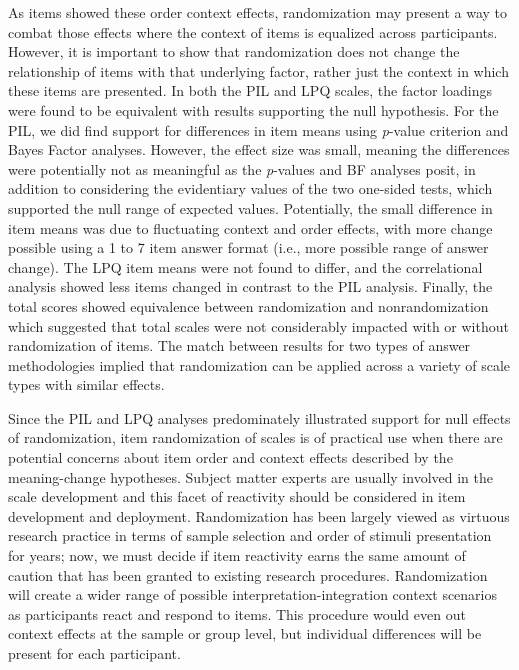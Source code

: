 \documentclass[english,man]{apa6}
\theoremstyle{definition}
\theoremstyle{definition}
\theoremstyle{definition}
\theoremstyle{remark}
\begin{document}
As items showed these order context effects, randomization may present a
way to combat those effects where the context of items is equalized
across participants. However, it is important to show that randomization
does not change the relationship of items with that underlying factor,
rather just the context in which these items are presented. In both the
PIL and LPQ scales, the factor loadings were found to be equivalent with
results supporting the null hypothesis. For the PIL, we did find support
for differences in item means using \emph{p}-value criterion and Bayes
Factor analyses. However, the effect size was small, meaning the
differences were potentially not as meaningful as the \emph{p}-values
and BF analyses posit, in addition to considering the evidentiary values
of the two one-sided tests, which supported the null range of expected
values. Potentially, the small difference in item means was due to
fluctuating context and order effects, with more change possible using a
1 to 7 item answer format (i.e., more possible range of answer change).
The LPQ item means were not found to differ, and the correlational
analysis showed less items changed in contrast to the PIL analysis.
Finally, the total scores showed equivalence between randomization and
nonrandomization which suggested that total scales were not considerably
impacted with or without randomization of items. The match between
results for two types of answer methodologies implied that randomization
can be applied across a variety of scale types with similar effects.

Since the PIL and LPQ analyses predominately illustrated support for
null effects of randomization, item randomization of scales is of
practical use when there are potential concerns about item order and
context effects described by the meaning-change hypotheses. Subject
matter experts are usually involved in the scale development and this
facet of reactivity should be considered in item development and
deployment. Randomization has been largely viewed as virtuous research
practice in terms of sample selection and order of stimuli presentation
for years; now, we must decide if item reactivity earns the same amount
of caution that has been granted to existing research procedures.
Randomization will create a wider range of possible
interpretation-integration context scenarios as participants react and
respond to items. This procedure would even out context effects at the
sample or group level, but individual differences will be present for
each participant.
\end{document}
